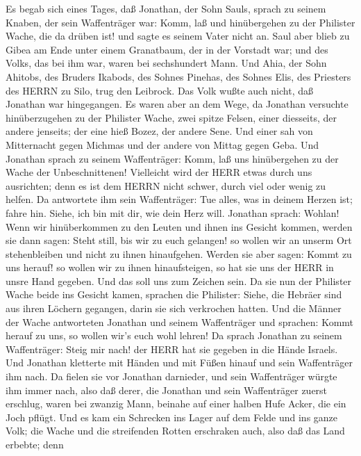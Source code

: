  Es begab sich eines Tages, daß Jonathan, der Sohn Sauls,
sprach zu seinem Knaben, der sein Waffenträger war: Komm, laß und
hinübergehen zu der Philister Wache, die da drüben ist! und sagte es
seinem Vater nicht an.  Saul aber blieb zu Gibea am Ende
unter einem Granatbaum, der in der Vorstadt war; und des Volks, das bei
ihm war, waren bei sechshundert Mann.  Und Ahia, der Sohn
Ahitobs, des Bruders Ikabods, des Sohnes Pinehas, des Sohnes Elis, des
Priesters des HERRN zu Silo, trug den Leibrock. Das Volk wußte auch
nicht, daß Jonathan war hingegangen.  Es waren aber an dem
Wege, da Jonathan versuchte hinüberzugehen zu der Philister Wache, zwei
spitze Felsen, einer diesseits, der andere jenseits; der eine hieß
Bozez, der andere Sene.  Und einer sah von Mitternacht gegen
Michmas und der andere von Mittag gegen Geba.  Und Jonathan
sprach zu seinem Waffenträger: Komm, laß uns hinübergehen zu der Wache
der Unbeschnittenen! Vielleicht wird der HERR etwas durch uns
ausrichten; denn es ist dem HERRN nicht schwer, durch viel oder wenig zu
helfen.  Da antwortete ihm sein Waffenträger: Tue alles, was
in deinem Herzen ist; fahre hin. Siehe, ich bin mit dir, wie dein Herz
will.  Jonathan sprach: Wohlan! Wenn wir hinüberkommen zu
den Leuten und ihnen ins Gesicht kommen,  werden sie dann
sagen: Steht still, bis wir zu euch gelangen! so wollen wir an unserm
Ort stehenbleiben und nicht zu ihnen hinaufgehen.  Werden
sie aber sagen: Kommt zu uns herauf! so wollen wir zu ihnen
hinaufsteigen, so hat sie uns der HERR in unsre Hand gegeben. Und das
soll uns zum Zeichen sein.  Da sie nun der Philister Wache
beide ins Gesicht kamen, sprachen die Philister: Siehe, die Hebräer sind
aus ihren Löchern gegangen, darin sie sich verkrochen hatten.
 Und die Männer der Wache antworteten Jonathan und seinem
Waffenträger und sprachen: Kommt herauf zu uns, so wollen wir's euch
wohl lehren! Da sprach Jonathan zu seinem Waffenträger: Steig mir nach!
der HERR hat sie gegeben in die Hände Israels.  Und
Jonathan kletterte mit Händen und mit Füßen hinauf und sein Waffenträger
ihm nach. Da fielen sie vor Jonathan darnieder, und sein Waffenträger
würgte ihm immer nach,  also daß derer, die Jonathan und
sein Waffenträger zuerst erschlug, waren bei zwanzig Mann, beinahe auf
einer halben Hufe Acker, die ein Joch pflügt.  Und es kam
ein Schrecken ins Lager auf dem Felde und ins ganze Volk; die Wache und
die streifenden Rotten erschraken auch, also daß das Land erbebte; denn
